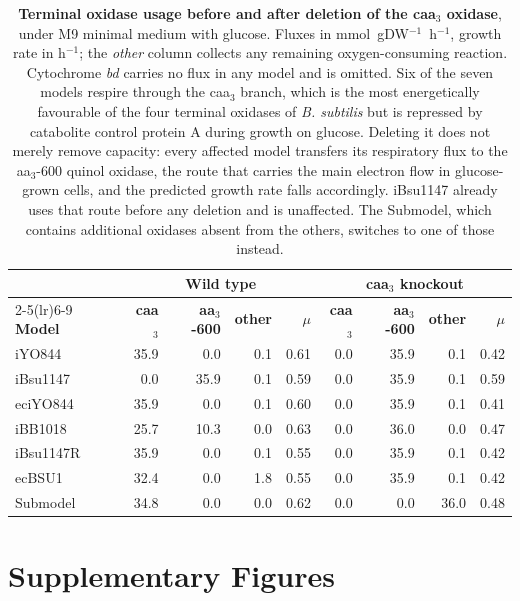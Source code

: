 \documentclass[12pt,a4paper]{article}
\begin{document}
\newpage
\newpage

\begin{table}[H]
\centering
\caption{\textbf{Terminal oxidase usage before and after deletion of the caa$_3$ oxidase}, under M9 minimal medium with glucose. Fluxes in mmol~gDW$^{-1}$~h$^{-1}$, growth rate in h$^{-1}$; the \textit{other} column collects any remaining oxygen-consuming reaction. Cytochrome \textit{bd} carries no flux in any model and is omitted. Six of the seven models respire through the caa$_3$ branch, which is the most energetically favourable of the four terminal oxidases of \textit{B. subtilis} but is repressed by catabolite control protein A during growth on glucose. Deleting it does not merely remove capacity: every affected model transfers its respiratory flux to the aa$_3$-600 quinol oxidase, the route that carries the main electron flow in glucose-grown cells, and the predicted growth rate falls accordingly. iBsu1147 already uses that route before any deletion and is unaffected. The Submodel, which contains additional oxidases absent from the others, switches to one of those instead.}
\label{tab:oxidase_flux}
\begin{tabular}{lrrrrrrrr}
\toprule
& \multicolumn{4}{c}{\textbf{Wild type}} & \multicolumn{4}{c}{\textbf{caa$_3$ knockout}} \\
\cmidrule(lr){2-5}\cmidrule(lr){6-9}
\textbf{Model} & \textbf{caa$_3$} & \textbf{aa$_3$-600} & \textbf{other} & \textbf{$\mu$}
               & \textbf{caa$_3$} & \textbf{aa$_3$-600} & \textbf{other} & \textbf{$\mu$} \\
\midrule
iYO844 & 35.9 & 0.0 & 0.1 & 0.61 & 0.0 & 35.9 & 0.1 & 0.42 \\
iBsu1147 & 0.0 & 35.9 & 0.1 & 0.59 & 0.0 & 35.9 & 0.1 & 0.59 \\
eciYO844 & 35.9 & 0.0 & 0.1 & 0.60 & 0.0 & 35.9 & 0.1 & 0.41 \\
iBB1018 & 25.7 & 10.3 & 0.0 & 0.63 & 0.0 & 36.0 & 0.0 & 0.47 \\
iBsu1147R & 35.9 & 0.0 & 0.1 & 0.55 & 0.0 & 35.9 & 0.1 & 0.42 \\
ecBSU1 & 32.4 & 0.0 & 1.8 & 0.55 & 0.0 & 35.9 & 0.1 & 0.42 \\
Submodel & 34.8 & 0.0 & 0.0 & 0.62 & 0.0 & 0.0 & 36.0 & 0.48 \\
\bottomrule
\end{tabular}
\end{table}


\section{Supplementary Figures}
\end{document}
